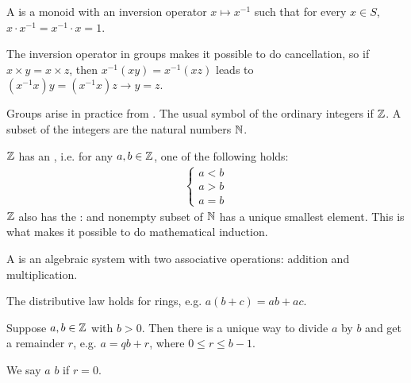 \documentclass[12pt]{scrartcl}
\begin{document}
\begin{definition}
    A  is a monoid with an inversion operator $x \mapsto x^{-1}$ such that for every $x \in S$, $x \cdot x^{-1} = x^{-1} \cdot x = 1$.
\end{definition}

\begin{remark}
    The inversion operator in groups makes it possible to do cancellation, so if $x \times y = x \times z$, then $x^{-1}(xy) = x^{-1}(xz)$ leads to $(x^{-1}x)y = (x^{-1}x)z \to y = z$.
\end{remark}

Groups arise in practice from . The usual symbol of the ordinary integers if $\mathbb Z$. A subset of the integers are the natural numbers $\mathbb N$.

\begin{remark}
    $\mathbb Z$ has an , i.e. for any $a, b \in \mathbb Z$, one of the following holds:
        \begin{align*}
            \begin{cases}
                a < b \\
                a > b \\
                a = b
            \end{cases}
        \end{align*}
    $\mathbb Z$ also has the : and nonempty subset of $\mathbb N$ has a unique smallest element. This is what makes it possible to do mathematical induction.
\end{remark}

\begin{definition}
    A  is an algebraic system with two associative operations: addition and multiplication.
\end{definition}

\begin{remark}
    The distributive law holds for rings, e.g. $a(b+c) = ab + ac$. 
\end{remark}

\begin{proposition}
    Suppose $a, b \in \mathbb Z$ with $b > 0$. Then there is a unique way to divide $a$ by $b$ and get a remainder $r$, e.g. $a = qb + r$, where $ 0 \leq r \leq b-1$.
\end{proposition}

\begin{definition}
    We say $a$  $b$ if $r = 0$.
\end{definition}
\end{document}
